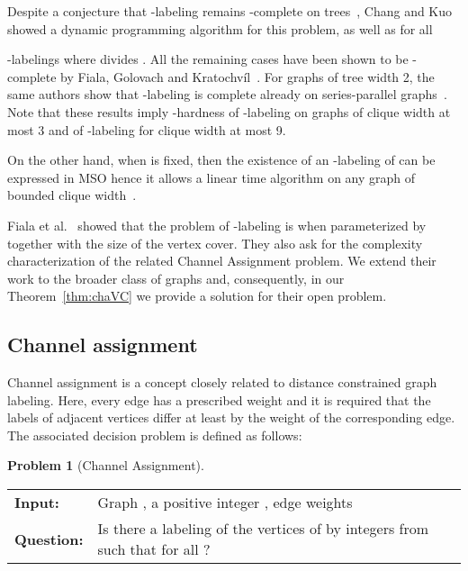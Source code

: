 \documentclass[a4paper,UKenglish]{lipics}
\newcommand{\NP}{{\sf{NP}}\xspace}
\newcommand{\FPT}{{\sf{FPT}}\xspace}
\theoremstyle{plain}
\theoremstyle{definition}
\newtheorem{prob}[theorem]{Problem}
\begin{document}
Despite a conjecture that {\sc -labeling} remains \NP-complete on trees~\cite{l:GY92}, 
Chang and Kuo~\cite{l:ChK96} showed a dynamic programming algorithm for this problem, 
as well as for all {-labelings where  divides . 
All the remaining cases have been shown to be \NP-complete by Fiala, Golovach and Kratochvíl~\cite{l:FGK08}. 
For graphs of tree width 2, the same authors show that {\sc -labeling} is \NP complete already on series-parallel graphs~\cite{l:FGK05}. 
Note that these results imply \NP-hardness 
of {\sc -labeling} on graphs of clique width at most 3 and of {\sc -labeling} for clique width at most 9.

On the other hand, when  is fixed, then the existence of an -labeling of  can be expressed in MSO hence it allows a linear time algorithm on any graph of bounded clique width~\cite{t:KR01}.

Fiala et al.~\cite{l:FGK09} showed that the problem of {\sc -labeling} is \FPT{} when
parameterized by  together with the size of the vertex cover. 
They also ask for the complexity characterization of the related {\sc Channel Assignment} problem.
We extend their work to the broader class of graphs and, consequently, in our Theorem~\ref{thm:chaVC} we provide a solution for their open problem.


\subsection{Channel assignment}

Channel assignment is a concept closely related to distance constrained graph labeling. 
Here, every edge has a prescribed weight  and it is required
that the labels of adjacent vertices differ at least by the weight of the corresponding edge. 
The associated decision problem is defined as follows:

\begin{prob}[\sc Channel Assignment]~
\begin{center}
\begin{tabular} {|ll|}
      \hline
      {\bf Input:\enspace} & {\parbox[t]{27em}{Graph , a positive integer , edge weights }}\\
      {\bf Question:\enspace}&\parbox[t]{27em}{Is there a labeling  of the vertices of  by integers from 
                                                such that  for all ?}\\
      \hline
\end{tabular}
\end{center}
\end{prob}

}
\end{document}
